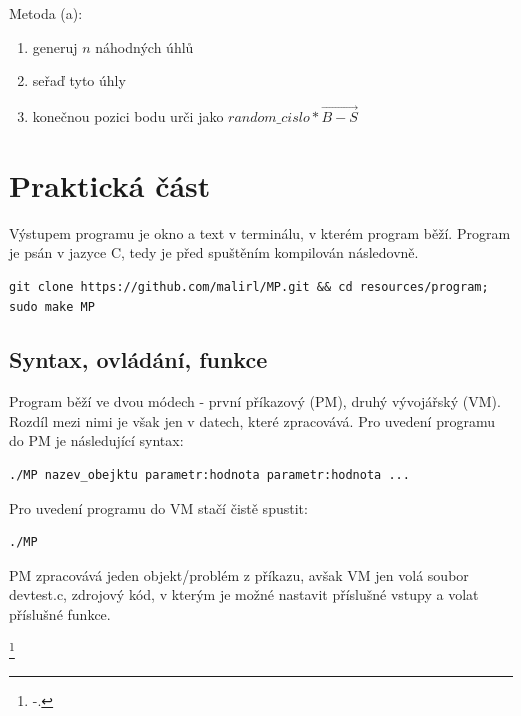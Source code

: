 \documentclass[a4paper,12pt]{report}
\begin{document}
\pagebreak
Metoda (a):
\begin{enumerate}[label=\arabic*, font=\bfseries] %
	\item generuj $n$ náhodných úhlů
	\item seřaď tyto úhly
	\item konečnou pozici bodu urči jako $random\_cislo*\vec{B-S}$
\end{enumerate}







 






\chapter{Praktická část}

Výstupem programu je okno a text v terminálu, v kterém program běží.
Program je psán v jazyce C, tedy je před spuštěním kompilován následovně.
\begin{lstlisting}
git clone https://github.com/malirl/MP.git && cd resources/program; sudo make MP
\end{lstlisting}


\section{Syntax, ovládání, funkce}

Program běží ve dvou módech - první příkazový (PM), druhý vývojářský (VM).
Rozdíl mezi nimi je však jen v datech, které zpracovává.
Pro uvedení programu do PM je následující syntax:
\begin{lstlisting}
./MP nazev_obejktu parametr:hodnota parametr:hodnota ...
\end{lstlisting}
Pro uvedení programu do VM stačí čistě spustit:
\begin{lstlisting}
./MP
\end{lstlisting}
PM zpracovává jeden objekt/problém z příkazu, avšak VM jen volá soubor devtest.c, zdrojový kód, v kterým je možné nastavit příslušné vstupy a volat příslušné 
funkce.

\footnote{-.}
\end{document}
